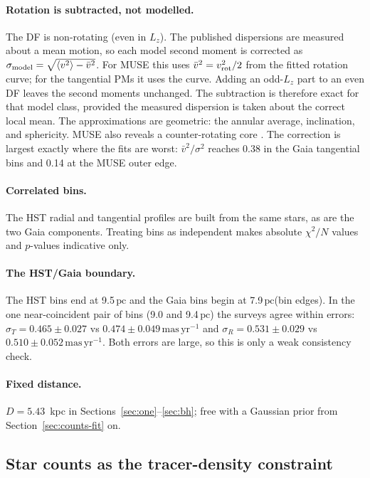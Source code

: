 \documentclass[11pt,a4paper]{article}
\newcommand{\pc}{\ensuremath{\,\mathrm{pc}}\xspace}
\newcommand{\masyr}{\ensuremath{\,\mathrm{mas\,yr^{-1}}}\xspace}
\begin{document}
\paragraph{Rotation is subtracted, not modelled.}
\label{sec:rotation}
The DF is non-rotating (even in $L_z$). The published dispersions are
measured about a mean motion, so each model second moment is corrected as
$\sigma_{\rm model}=\sqrt{\langle v^2\rangle-\bar v^2}$. For MUSE this uses
$\bar v^2=v_{\rm rot}^2/2$ from the fitted rotation curve; for the tangential
PMs it uses the \citet{2021MNRAS.505.5978V} curve. Adding an odd-$L_z$ part
to an even DF leaves the second moments unchanged. The subtraction is
therefore exact for that model class, provided the measured dispersion is
taken about the correct local mean. The approximations are geometric: the
annular average, inclination, and sphericity. MUSE also reveals a
counter-rotating core \citep{2024MNRAS.528.4941P}. The correction is largest
exactly where the fits are worst: $\bar v^2/\sigma^2$ reaches 0.38 in the
Gaia tangential bins and 0.14 at the MUSE outer edge.

\paragraph{Correlated bins.}
The HST radial and tangential profiles are built from the same stars, as are
the two Gaia components. Treating bins as independent makes absolute
$\chi^2/N$ values and $p$-values indicative only.

\paragraph{The HST/Gaia boundary.}
The HST bins end at 9.5\pc and the Gaia bins begin at 7.9\pc (bin edges). In
the one near-coincident pair of bins (9.0 and 9.4\pc) the surveys agree
within errors: $\sigma_T=0.465\pm0.027$ vs $0.474\pm0.049\masyr$ and
$\sigma_R=0.531\pm0.029$ vs $0.510\pm0.052\masyr$. Both errors are large, so
this is only a weak consistency check.

\paragraph{Fixed distance.} $D=5.43$~kpc in Sections~\ref{sec:one}--\ref{sec:bh};
free with a Gaussian prior from Section~\ref{sec:counts-fit} on.

\subsection{Star counts as the tracer-density constraint}
\label{sec:counts}
\end{document}
